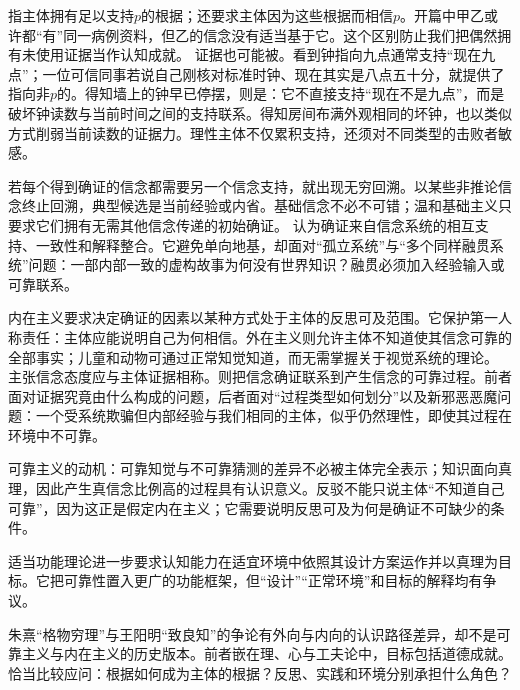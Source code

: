 指主体拥有足以支持$p$的根据；还要求主体因为这些根据而相信$p$。开篇中甲乙或许都“有”同一病例资料，但乙的信念没有适当基于它。这个区别防止我们把偶然拥有未使用证据当作认知成就。 证据也可能被。看到钟指向九点通常支持“现在九点”；一位可信同事若说自己刚核对标准时钟、现在其实是八点五十分，就提供了指向非$p$的。得知墙上的钟早已停摆，则是：它不直接支持“现在不是九点”，而是破坏钟读数与当前时间之间的支持联系。得知房间布满外观相同的坏钟，也以类似方式削弱当前读数的证据力。理性主体不仅累积支持，还须对不同类型的击败者敏感。

若每个得到确证的信念都需要另一个信念支持，就出现无穷回溯。以某些非推论信念终止回溯，典型候选是当前经验或内省。基础信念不必不可错；温和基础主义只要求它们拥有无需其他信念传递的初始确证。 认为确证来自信念系统的相互支持、一致性和解释整合\parencite{bonjour1985}。它避免单向地基，却面对“孤立系统”与“多个同样融贯系统”问题：一部内部一致的虚构故事为何没有世界知识？融贯必须加入经验输入或可靠联系。

内在主义要求决定确证的因素以某种方式处于主体的反思可及范围。它保护第一人称责任：主体应能说明自己为何相信。外在主义则允许主体不知道使其信念可靠的全部事实；儿童和动物可通过正常知觉知道，而无需掌握关于视觉系统的理论。 主张信念态度应与主体证据相称\parencite{conee1985}。则把信念确证联系到产生信念的可靠过程\parencite{goldman1979}。前者面对证据究竟由什么构成的问题，后者面对“过程类型如何划分”以及新邪恶恶魔问题：一个受系统欺骗但内部经验与我们相同的主体，似乎仍然理性，即使其过程在环境中不可靠。

\begin{argumentbox}
可靠主义的动机：可靠知觉与不可靠猜测的差异不必被主体完全表示；知识面向真理，因此产生真信念比例高的过程具有认识意义。反驳不能只说主体“不知道自己可靠”，因为这正是假定内在主义；它需要说明反思可及为何是确证不可缺少的条件。
\end{argumentbox}

适当功能理论进一步要求认知能力在适宜环境中依照其设计方案运作并以真理为目标\parencite{plantinga1993}。它把可靠性置入更广的功能框架，但“设计”“正常环境”和目标的解释均有争议。

\begin{comparison}
朱熹“格物穷理”与王阳明“致良知”的争论有外向与内向的认识路径差异，却不是可靠主义与内在主义的历史版本\parencite{tiwald2014}。前者嵌在理、心与工夫论中，目标包括道德成就。恰当比较应问：根据如何成为主体的根据？反思、实践和环境分别承担什么角色？
\end{comparison}

